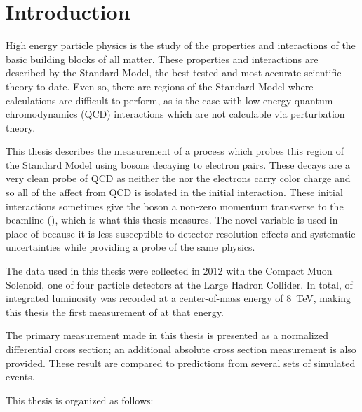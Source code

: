\chapter{Introduction}
\label{chapter:intro}

High energy particle physics is the study of the properties and interactions of
the basic building blocks of all matter. These properties and interactions are
described by the Standard Model, the best tested and most accurate scientific
theory to date. Even so, there are regions of the Standard Model where
calculations are difficult to perform, as is the case with low energy quantum
chromodynamics (QCD) interactions which are not calculable via perturbation
theory.

This thesis describes the measurement of a process which probes this region of
the Standard Model using \Z bosons decaying to electron pairs. These decays are
a very clean probe of QCD as neither the \Z nor the electrons carry color
charge and so all of the affect from QCD is isolated in the initial
interaction. These initial interactions sometimes give the \Z boson a non-zero
momentum transverse to the beamline (\bosonpt), which is what this thesis
measures. The novel variable \phistar is used in place of \bosonpt because it
is less susceptible to detector resolution effects and systematic uncertainties
while providing a probe of the same physics.

The data used in this thesis were collected in 2012 with the Compact Muon
Solenoid, one of four particle detectors at the Large Hadron Collider. In
total, \GoodLumiNumber of integrated luminosity was recorded at a
center-of-mass energy of \SI{8}{\TeV}, making this thesis the first measurement
of \phistar at that energy.

The primary measurement made in this thesis is presented as a normalized
differential cross section; an additional absolute cross section measurement is
also provided. These result are compared to predictions from several sets of
simulated events.

This thesis is organized as follows:

